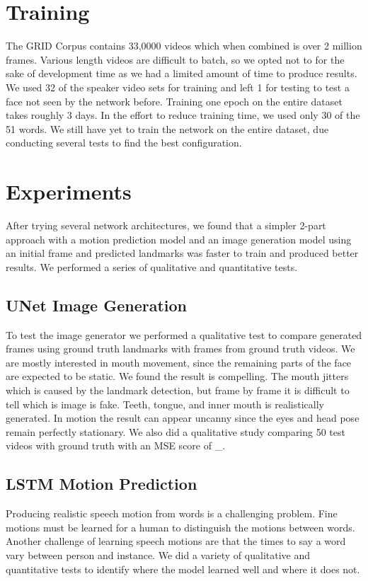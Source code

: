\documentclass[10pt,twocolumn,letterpaper]{article}
\begin{document}
\section{Training}
 The GRID Corpus contains 33,0000 videos which when combined is over 2 million frames. Various length videos are difficult to batch, so we opted not to for the sake of development time as we had a limited amount of time to produce results. We used 32 of the speaker video sets for training and left 1 for testing to test a face not seen by the network before. Training one epoch on the entire dataset takes roughly 3 days. In the effort to reduce training time, we used only 30 of the 51 words. We still have yet to train the network on the entire dataset, due conducting several tests to find the best configuration.

\section{Experiments}

 After trying several network architectures, we found that a simpler 2-part approach with a motion prediction model and an image generation model using an initial frame and predicted landmarks was faster to train and produced better results. We performed a series of qualitative and quantitative tests. 
 
\subsection{UNet Image Generation}
 To test the image generator we performed a qualitative test to compare generated frames using ground truth landmarks with frames from ground truth videos. We are mostly interested in mouth movement, since the remaining parts of the face are expected to be static. We found the result is compelling. The mouth jitters which is caused by the landmark detection, but frame by frame it is difficult to tell which is image is fake. Teeth, tongue, and inner mouth is realistically generated. In motion the result can appear uncanny since the eyes and head pose remain perfectly stationary. We also did a qualitative study comparing 50 test videos with ground truth with an MSE score of \_.
 
\subsection{LSTM Motion Prediction}
 Producing realistic speech motion from words is a challenging problem. Fine motions must be learned for a human to distinguish the motions between words. Another challenge of learning speech motions are that the times to say a word vary between person and instance. We did a variety of qualitative and quantitative tests to identify where the model learned well and where it does not. 
 
\end{document}
